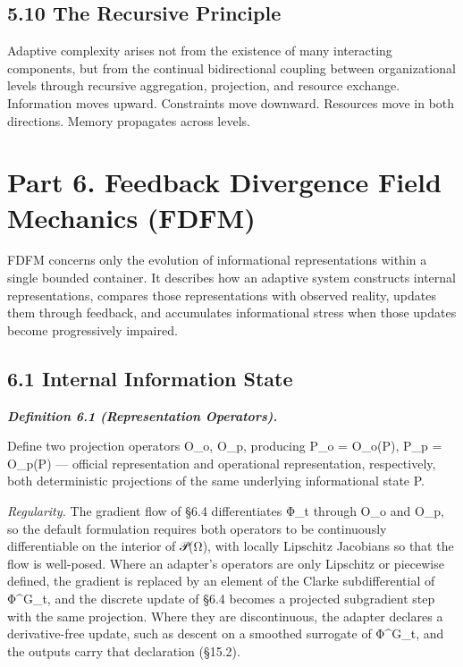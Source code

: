 \documentclass[
]{article}
\begin{document}
\hypertarget{the-recursive-principle}{%
\subsection{5.10 The Recursive
Principle}\label{the-recursive-principle}}

Adaptive complexity arises not from the existence of many interacting
components, but from the continual bidirectional coupling between
organizational levels through recursive aggregation, projection, and
resource exchange. Information moves upward. Constraints move downward.
Resources move in both directions. Memory propagates across levels.

\hypertarget{part-6.-feedback-divergence-field-mechanics-fdfm}{%
\section{Part 6. Feedback Divergence Field Mechanics
(FDFM)}\label{part-6.-feedback-divergence-field-mechanics-fdfm}}

FDFM concerns only the evolution of informational representations within
a single bounded container. It describes how an adaptive system
constructs internal representations, compares those representations with
observed reality, updates them through feedback, and accumulates
informational stress when those updates become progressively impaired.

\hypertarget{internal-information-state}{%
\subsection{6.1 Internal Information
State}\label{internal-information-state}}

\emph{\textbf{Definition 6.1 (Representation Operators).}}

Define two projection operators O\_o, O\_p, producing P\_o = O\_o(P),
P\_p = O\_p(P) --- official representation and operational
representation, respectively, both deterministic projections of the same
underlying informational state P.

\emph{Regularity.} The gradient flow of §6.4 differentiates Φ\_t through
O\_o and O\_p, so the default formulation requires both operators to be
continuously differentiable on the interior of 𝒫(Ω), with locally
Lipschitz Jacobians so that the flow is well-posed. Where an adapter's
operators are only Lipschitz or piecewise defined, the gradient is
replaced by an element of the Clarke subdifferential of Φ\^{}G\_t, and
the discrete update of §6.4 becomes a projected subgradient step with
the same projection. Where they are discontinuous, the adapter declares
a derivative-free update, such as descent on a smoothed surrogate of
Φ\^{}G\_t, and the outputs carry that declaration (§15.2).
\end{document}
